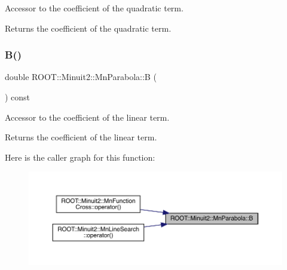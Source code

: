 Accessor to the coefficient of the quadratic term.

\begin{DoxyReturn}{Returns}
the coefficient of the quadratic term. 
\end{DoxyReturn}
\mbox{\label{classROOT_1_1Minuit2_1_1MnParabola_a878824850afd7ec98fd8685bec89784b}} 
\subsubsection{\texorpdfstring{B()}{B()}\hspace{0.1cm}{\footnotesize\ttfamily [1/2]}}
{\footnotesize\ttfamily double R\+O\+O\+T\+::\+Minuit2\+::\+Mn\+Parabola\+::B (\begin{DoxyParamCaption}{ }\end{DoxyParamCaption}) const\hspace{0.3cm}{\ttfamily [inline]}}

Accessor to the coefficient of the linear term.

\begin{DoxyReturn}{Returns}
the coefficient of the linear term. 
\end{DoxyReturn}
Here is the caller graph for this function\+:\nopagebreak
\begin{figure}[H]
\begin{center}
\leavevmode
\includegraphics[width=350pt]{db/d7d/classROOT_1_1Minuit2_1_1MnParabola_a878824850afd7ec98fd8685bec89784b_icgraph}
\end{center}
\end{figure}
\mbox{\label{classROOT_1_1Minuit2_1_1MnParabola_a878824850afd7ec98fd8685bec89784b}} 
